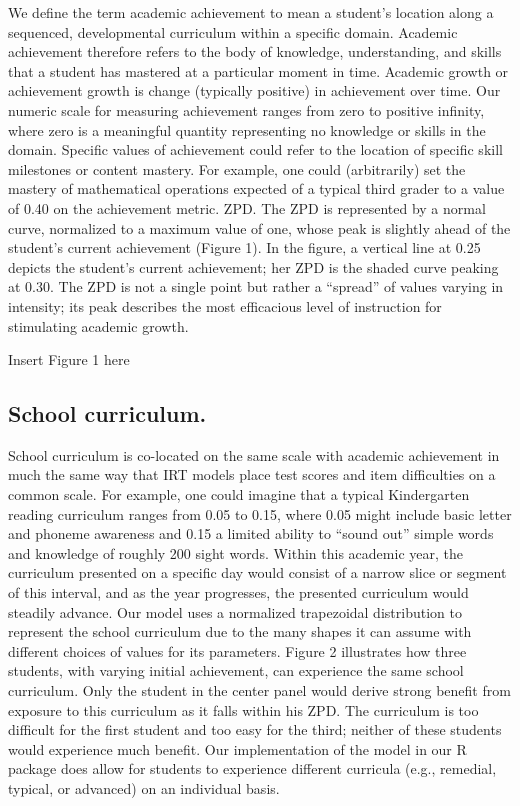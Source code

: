 \documentclass[english,floatsintext,man]{apa6}
\theoremstyle{definition}
\theoremstyle{definition}
\theoremstyle{definition}
\theoremstyle{remark}
\begin{document}
We define the term academic achievement to mean a student's location
along a sequenced, developmental curriculum within a specific domain.
Academic achievement therefore refers to the body of knowledge,
understanding, and skills that a student has mastered at a particular
moment in time. Academic growth or achievement growth is change
(typically positive) in achievement over time. Our numeric scale for
measuring achievement ranges from zero to positive infinity, where zero
is a meaningful quantity representing no knowledge or skills in the
domain. Specific values of achievement could refer to the location of
specific skill milestones or content mastery. For example, one could
(arbitrarily) set the mastery of mathematical operations expected of a
typical third grader to a value of 0.40 on the achievement metric. ZPD.
The ZPD is represented by a normal curve, normalized to a maximum value
of one, whose peak is slightly ahead of the student's current
achievement (Figure 1). In the figure, a vertical line at 0.25 depicts
the student's current achievement; her ZPD is the shaded curve peaking
at 0.30. The ZPD is not a single point but rather a \enquote{spread} of
values varying in intensity; its peak describes the most efficacious
level of instruction for stimulating academic growth.

Insert Figure 1 here

\subsection{School curriculum.}\label{school-curriculum.}

School curriculum is co-located on the same scale with academic
achievement in much the same way that IRT models place test scores and
item difficulties on a common scale. For example, one could imagine that
a typical Kindergarten reading curriculum ranges from 0.05 to 0.15,
where 0.05 might include basic letter and phoneme awareness and 0.15 a
limited ability to \enquote{sound out} simple words and knowledge of
roughly 200 sight words. Within this academic year, the curriculum
presented on a specific day would consist of a narrow slice or segment
of this interval, and as the year progresses, the presented curriculum
would steadily advance. Our model uses a normalized trapezoidal
distribution to represent the school curriculum due to the many shapes
it can assume with different choices of values for its parameters.
Figure 2 illustrates how three students, with varying initial
achievement, can experience the same school curriculum. Only the student
in the center panel would derive strong benefit from exposure to this
curriculum as it falls within his ZPD. The curriculum is too difficult
for the first student and too easy for the third; neither of these
students would experience much benefit. Our implementation of the model
in our R package does allow for students to experience different
curricula (e.g., remedial, typical, or advanced) on an individual basis.
\end{document}
